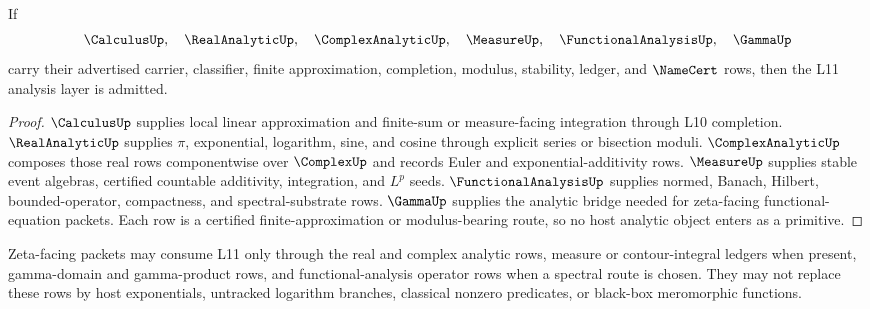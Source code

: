 \begin{theorem}
\label{thm:analysis-spine-admission}
If
$$
\CalculusUp,\quad
\RealAnalyticUp,\quad
\ComplexAnalyticUp,\quad
\MeasureUp,\quad
\FunctionalAnalysisUp,\quad
\GammaUp
$$
carry their advertised carrier, classifier, finite approximation, completion,
modulus, stability, ledger, and $\NameCert$ rows, then the L11 analysis layer
is admitted.
\end{theorem}

\begin{proof}
$\CalculusUp$ supplies local linear approximation and finite-sum or
measure-facing integration through L10 completion.  $\RealAnalyticUp$
supplies $\pi$, exponential, logarithm, sine, and cosine through explicit
series or bisection moduli.  $\ComplexAnalyticUp$ composes those real rows
componentwise over $\ComplexUp$ and records Euler and exponential-additivity
rows.  $\MeasureUp$ supplies stable event algebras, certified countable
additivity, integration, and $L^p$ seeds.  $\FunctionalAnalysisUp$ supplies
normed, Banach, Hilbert, bounded-operator, compactness, and spectral-substrate
rows.  $\GammaUp$ supplies the analytic bridge needed for zeta-facing
functional-equation packets.  Each row is a certified finite-approximation or
modulus-bearing route, so no host analytic object enters as a primitive.
\end{proof}

\begin{principle}
\label{prin:analysis-spine-zeta-consumption}
Zeta-facing packets may consume L11 only through the real and complex
analytic rows, measure or contour-integral ledgers when present, gamma-domain
and gamma-product rows, and functional-analysis operator rows when a spectral
route is chosen.  They may not replace these rows by host exponentials,
untracked logarithm branches, classical nonzero predicates, or black-box
meromorphic functions.
\end{principle}
